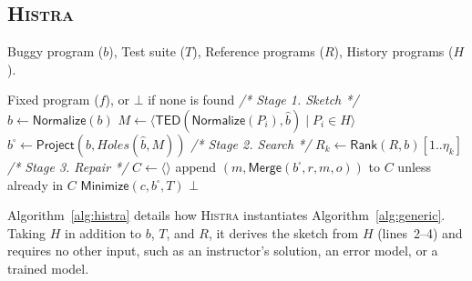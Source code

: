 \documentclass[10pt,conference]{IEEEtran}
\begin{document}
\subsection{\textup{\textsc{Histra}}}\label{sec:algorithm}

\begin{algorithm}[h]
\caption{\textsc{Histra}}\label{alg:histra}
\footnotesize
\begin{algorithmic}[1]
\item[\textbf{Input:}] Buggy program ($b$), Test suite ($T$), Reference programs ($R$), History programs ($H$).
\item[\textbf{Output:}] Fixed program ($f$), or $\bot$ if none is found
  \Statex\hspace{\algorithmicindent}\textit{/* Stage 1. Sketch */}
  \State $\hat{b} \gets \mathsf{Normalize}(b)$ 
  \State $M \gets \langle \mathsf{TED}(\mathsf{Normalize}(P_i), \hat{b}) \mid P_i \in H \rangle$ 
  \State $b^{\square} \gets \mathsf{Project}(b, \mathit{Holes}(\hat{b}, M))$ 
  \Statex\hspace{\algorithmicindent}\textit{/* Stage 2. Search */}
  \State $R_k \gets \mathsf{Rank}(R, b)[1..\eta_k]$ 
  \Statex\hspace{\algorithmicindent}\textit{/* Stage 3. Repair */}
  \State $C \gets \langle\rangle$
   
      \State append $(m, \mathsf{Merge}(b^{\square}, r, m, o))$ to $C$ unless already in $C$
    \EndFor
  \EndFor
      \State \Return $\mathsf{Minimize}(c, b^{\square}, T)$ 
    \EndIf
  \EndFor
  \State \Return $\bot$
\EndProcedure
\end{algorithmic}
\end{algorithm}

Algorithm~\ref{alg:histra} details how \textsc{Histra} instantiates Algorithm~\ref{alg:generic}. Taking $H$ in addition to $b$, $T$, and $R$, it derives the sketch from $H$ (lines~2--4) and requires no other input, such as an instructor's solution, an error model, or a trained model.
\end{document}
